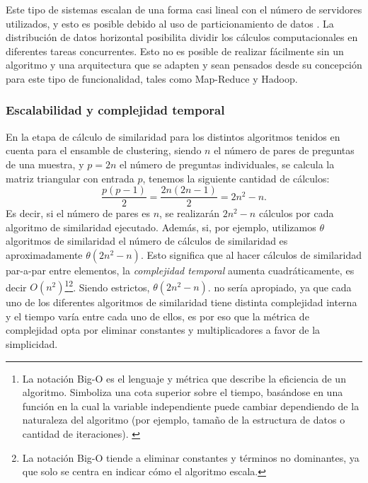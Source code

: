 \bigskip Este tipo de sistemas escalan de una forma casi lineal con el número de servidores utilizados, y esto es posible debido al uso de particionamiento de datos \citep{pokorny2013nosql}. La distribución de datos horizontal posibilita dividir los cálculos computacionales en diferentes tareas concurrentes. Esto no es posible de realizar fácilmente sin un algoritmo y una arquitectura que se adapten y sean pensados desde su concepción para este tipo de funcionalidad, tales como Map-Reduce y Hadoop.

\subsubsection{Escalabilidad y complejidad temporal}
En la etapa de cálculo de similaridad para los distintos algoritmos tenidos en cuenta para el ensamble de clustering, siendo \(n\) el número de pares de preguntas de una muestra, y \(p = 2n\) el número de preguntas individuales, se calcula la matriz triangular con entrada \(p\), tenemos la siguiente cantidad de cálculos:
\[\frac{p(p-1)}{2} = \frac{2n(2n-1)}{2} = 2n^2-n.\]
Es decir, si el número de pares es \(n\), se realizarán \(2n^2-n\) cálculos por cada algoritmo de similaridad ejecutado. Además, si, por ejemplo, utilizamos \(\theta\) algoritmos de similaridad el número de cálculos de similaridad es aproximadamente \(\theta(2n^2-n)\). Esto significa que al hacer cálculos de similaridad par-a-par entre elementos, la \textit{complejidad temporal} aumenta cuadráticamente, es decir \(O(n^2)\)\footnote{La notación Big-O es el lenguaje y métrica que describe la eficiencia de un algoritmo. Simboliza una cota superior sobre el tiempo, basándose en una función en la cual la variable independiente puede cambiar dependiendo de la naturaleza del algoritmo (por ejemplo, tamaño de la estructura de datos o cantidad de iteraciones). \citep{cormen2009introduction}}\footnote{La notación Big-O tiende a eliminar constantes y términos no dominantes, ya que solo se centra en indicar cómo el algoritmo escala. }. Siendo estrictos, \(\theta(2n^2-n)\). no sería apropiado, ya que cada uno de los diferentes algoritmos de similaridad tiene distinta complejidad interna y el tiempo varía entre cada uno de ellos, es por eso que la métrica de complejidad opta por eliminar constantes y multiplicadores a favor de la simplicidad.


